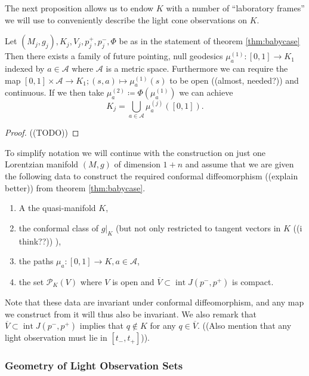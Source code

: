 The next proposition allows us to endow $K$ with a number of \enquote{laboratory frames} we will use to conveniently describe the light cone observations on $K$.
\begin{proposition}
Let $(M_j,g_j), K_j, V_j, p_j^+,p_j^-, \Phi$ be as in the statement of theorem \ref{thm:babycase}
Then there exists a family of future pointing, null geodesics $\mu_a^{(1)}:[0,1]\to K_1$ indexed by $a\in \mathcal{A}$ where $\mathcal{A}$ is a metric space. Furthermore we can require the map $[0,1]\times\mathcal{A}\to K_1; (s,a)\mapsto \mu^{(1)}_a(s)$ to be open ((almost, needed?)) and continuous. If we then take $\mu^{(2)}_a\coloneqq\Phi(\mu^{(1)}_a)$ we can achieve
\begin{equation}\label{eq:frameunion}
K_j = \bigcup_{a\in \mathcal{A}}\mu^{(j)}_a([0,1]).
\end{equation}
\end{proposition}
\begin{proof}
((TODO))
\end{proof}

\begin{remark}\label{rmk:data}To simplify notation we will continue with the construction on just one Lorentzian manifold $(M,g)$ of dimension $1+n$ and assume that we are given the following data to construct the required conformal diffeomorphism ((explain better)) from theorem \ref{thm:babycase}.

\begin{enumerate}
    \item A the quasi-manifold $K$,
    \item the conformal class of $g\rvert_K$ (but not only restricted to tangent vectors in $K$ ((i think??)) ),
    \item the paths $\mu_a:[0,1]\to K, a\in \mathcal{A}$,
    \item the set $\mathcal{P}_K(V)$ where $V$ is open and $\overline{V}\subset \operatorname{int} J(p^-,p^+)$ is compact.
\end{enumerate}
Note that these data are invariant under conformal diffeomorphism, and any map we construct from it will thus also be invariant. We also remark that $\overline{V}\subset \operatorname{int} J(p^-,p^+)$ implies that $q\notin K$ for any $q\in \overline{V}$. ((Also mention that any light observation must lie in $[t_-,t_+]$)).
\end{remark}

\subsubsection{Geometry of Light Observation Sets}



